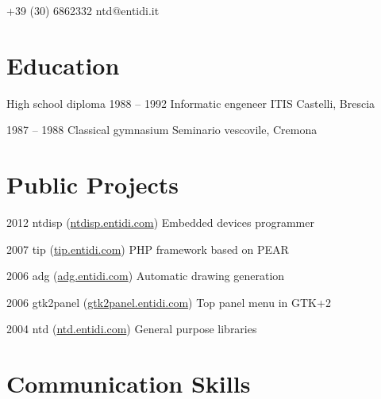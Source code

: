 \documentclass{tccv}
\begin{document}
\hfill
%
%
\begin{minipage}[t]{0.44\linewidth}
\vspace{0pt} %

    {+39 (30) 6862332}
    {ntd@entidi.it}

\section{Education}

\begin{yearlist}

\item[High school diploma]{1988 -- 1992}
     {Informatic engeneer}
     {ITIS Castelli, Brescia}

\item{1987 -- 1988}
     {Classical gymnasium}
     {Seminario vescovile, Cremona}

\end{yearlist}


\section{Public Projects}

\begin{yearlist}

\item{2012}
     {ntdisp (\href{http://ntdisp.entidi.com/}{ntdisp.entidi.com})}
     {Embedded devices programmer}

\item{2007}
     {tip (\href{http://tip.entidi.com/}{tip.entidi.com})}
     {PHP framework based on PEAR}

\item{2006}
     {adg (\href{http://adg.entidi.com/}{adg.entidi.com})}
     {Automatic drawing generation}

\item{2006}
     {gtk2panel (\href{http://gtk2panel.entidi.com/}{gtk2panel.entidi.com})}
     {Top panel menu in GTK+2}

\item{2004}
     {ntd (\href{http://ntd.entidi.com/}{ntd.entidi.com})}
     {General purpose libraries}

\end{yearlist}

\section{Communication Skills}


\end{minipage}
\end{document}
